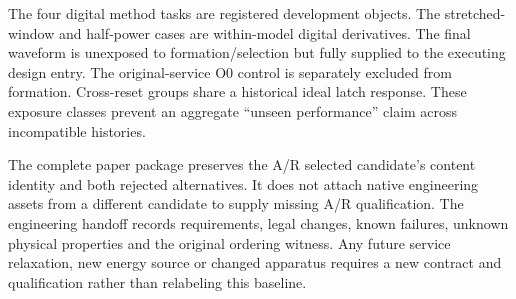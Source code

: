 The four digital method tasks are registered development objects. The
stretched-window and half-power cases are within-model digital derivatives.
The final waveform is unexposed to formation/selection but fully supplied to
the executing design entry. The original-service O0 control is separately
excluded from formation. Cross-reset groups share a historical ideal latch
response. These exposure classes prevent an aggregate ``unseen performance''
claim across incompatible histories.

The complete paper package preserves the A/R selected candidate's content
identity and both rejected alternatives. It does not attach native engineering
assets from a different candidate to supply missing A/R qualification. The
engineering handoff records requirements, legal changes, known failures,
unknown physical properties and the original ordering witness. Any future
service relaxation, new energy source or changed apparatus requires a new
contract and qualification rather than relabeling this baseline.
